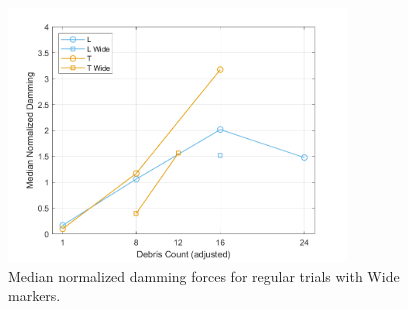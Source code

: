 \documentclass{article}
\begin{document}
\begin{figure}[htbp]
    \centering
    \includegraphics[width=0.8\textwidth]{Damming_Regular_RemappedT_Medians.png}
    \caption{Median normalized damming forces for regular trials with Wide markers.}
    \label{fig:damming_medians_wide}
\end{figure}

\end{document}
